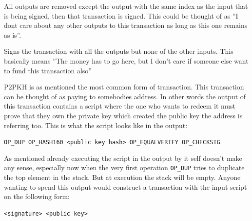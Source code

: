 All outputs are removed except the output with the same index as the input that is being signed, then that transaction is signed.
This could be thought of as ''I dont care about any other outputs to this transaction as long as this one remains as is''.

Signs the transaction with all the outputs but none of the other inputs. This basically means ''The money has to go here, but I don't care if someone else want to fund this transaction also''


\label{p2pkh}
P2PKH is as mentioned the most common form of transaction.\cite{antonopoulos_2017} This transaction can be thought of as paying to somebodies address. In other words the output of this transaction contains a script where the one who wants to redeem it must prove that they own the private key which created the public key the address is referring too. This is what the script looks like in the output:

\texttt{OP\_DUP OP\_HASH160 <public key hash> OP\_EQUALVERIFY OP\_CHECKSIG}

As mentioned already executing the script in the output by it self doesn't make any sense, especially now when the very first operation \texttt{OP\_DUP} tries to duplicate the top element in the stack. But at execution the stack will be empty. Anyone wanting to spend this output would construct a transaction with the input script on the following form:

\texttt{<signature> <public key>}

